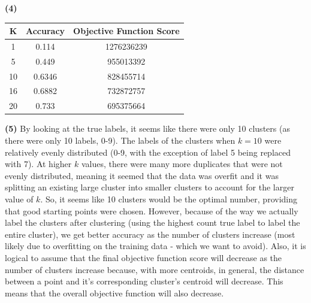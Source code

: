 \documentclass[11pt]{article}
\renewcommand{\part}[1] {\vspace{.10in} {\bf (#1)}}
\begin{document}
\part{4}
\begin{table}
    \begin{tabular}{|c|c|c|}
        \hline
        K  & Accuracy & Objective Function Score \\ \hline
        1  & 0.114    & 1276236239               \\ 
        5  & 0.449    & 955013392                \\ 
        10 & 0.6346   & 828455714                \\ 
        16 & 0.6882   & 732872757                \\ 
        20 & 0.733    & 695375664                \\
        \hline
    \end{tabular}
\end{table}

\part{5}
By looking at the true labels, it seems like there were only 10 clusters (as there were only 10 labels, 0-9). The labels of the clusters when $k=10$ were relatively evenly distributed (0-9, with the exception of label 5 being replaced with 7). At higher $k$ values, there were many more duplicates that were not evenly distributed, meaning it seemed that the data was overfit and it was splitting an existing large cluster into smaller clusters to account for the larger value of $k$. So, it seems like 10 clusters would be the optimal number, providing that good starting points were chosen. However, because of the way we actually label the clusters after clustering (using the highest count true label to label the entire cluster), we get better accuracy as the number of clusters increase (most likely due to overfitting on the training data - which we want to avoid). Also, it is logical to assume that the final objective function score will decrease as the number of clusters increase because, with more centroids, in general, the distance between a point and it's corresponding cluster's centroid will decrease. This means that the overall objective function will also decrease. 
\end{document}
